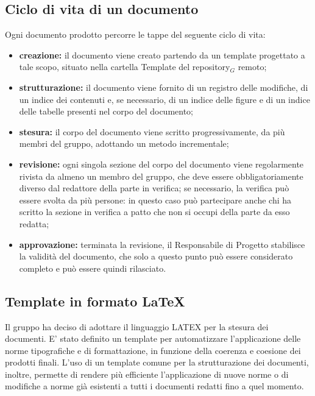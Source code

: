 \subsection{Ciclo di vita di un documento}\label{ProcessiDiSupportoDocumentazioneCicloDiVitaDiUnDocumento}
Ogni documento prodotto percorre le tappe del seguente ciclo di vita:
\begin{itemize}
\item \textbf{creazione:} il documento viene creato partendo da un template progettato a tale
	scopo, situato nella cartella Template del repository$_G$ remoto;
	\item \textbf{strutturazione:} il documento viene fornito di un registro delle modifiche, di un indice dei   contenuti e, se necessario, di un indice delle figure e di un indice delle tabelle presenti nel corpo del documento;
		\item \textbf{stesura:} il corpo del documento viene scritto progressivamente, da più membri del gruppo, adottando un metodo incrementale;
			\item \textbf{revisione:} ogni singola sezione del corpo del documento viene regolarmente rivista da almeno un membro del gruppo, che deve essere obbligatoriamente diverso dal redattore della parte in verifica; se necessario, la verifica può essere svolta da più persone: in questo caso può partecipare anche chi ha scritto la sezione in verifica a patto che non si occupi della parte da esso redatta;
				\item \textbf{approvazione:} terminata la revisione, il Responsabile di Progetto stabilisce la validità del documento, che solo a questo punto può essere considerato completo e può essere quindi rilasciato.
\end{itemize}
\subsection{Template in formato \LaTeX}\label{ProcessiDiSupportoDocumentazioneTemplateInFormatoLatex}
Il gruppo ha deciso di adottare il linguaggio LATEX per la stesura dei documenti. E' stato definito un template per automatizzare l’applicazione delle norme tipografiche e di formattazione, in funzione della coerenza e coesione dei prodotti finali.
L’uso di un template comune per la strutturazione dei documenti, inoltre, permette di rendere più efficiente l’applicazione di nuove norme o di modifiche a norme già esistenti a tutti i documenti redatti fino a quel momento.
